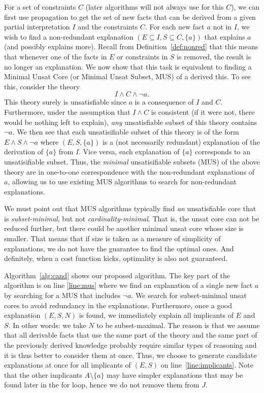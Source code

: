 For a set of constraints $C$ (later algorithms will not always use \allconstraints for this $C$), we can first use propagation to get the set of new facts that can be derived from a given partial interpretation $I$ and the constraints $C$. For each new fact $a$ not in $I$, we wish to find a non-redundant explanation $(E \subseteq I, S \subseteq C,\{a\})$ that explains $a$ (and possibly explains more). Recall from Definition~\ref{def:nonred} that this means that whenever one of the facts in $E$ or constraints in $S$ is removed, the result is no longer an explanation.
We now show that this task is equivalent to finding a Minimal Unsat Core (or Minimal Unsat Subset, MUS) of a derived this.
To see this, consider the theory
\[ I\wedge C \wedge \lnot a.\]
This theory surely is unsatisfiable since $a$ is a consequence of $I$ and $C$.
Furthermore, under the assumption that $I\wedge C$ is consistent (if it were not, there would be nothing left to explain),
\emph{any} unsatisfiable subset of this theory contains $\lnot a$.
We then see that each unsatisifiable subset of this theory is of the form $E \wedge S \wedge \lnot a$ where $(E,S,\{a\})$ is a (not necessarily redundant) explanation of the derivation of $\{a\}$ from $I$.
Vice versa, each explanation of $\{a\}$ corresponds to an unsatisifiable subset. Thus, the \emph{minimal} unsatisifiable subsets (MUS) of the above theory are in one-to-one correspondence with the non-redundant explanations of $a$, allowing us to use existing MUS algorithms to search for non-redundant explanations.

We must point out that MUS algorithms typically find \textit{an} unsatisfiable core that is \textit{subset-minimal}, but not \textit{cardinality-minimal}. That is, the unsat core can not be reduced further, but there could be another minimal unsat core whose size is smaller.
That means that if size is taken as a measure of simplicity of explanations, we do not have the guarantee to find the optimal ones. And definitely, when a cost function kicks, optimality is also not guaranteed.

Algorithm~\ref{alg:cand} shows our proposed algorithm. The key part of the algorithm is on line \ref{line:mus} where we find an explanation of a single new fact $a$ by searching for a MUS that includes $\neg a$.
We search for subset-minimal unsat cores to avoid redundancy in the explanations.
Furthermore, once a good explanation $(E,S,N)$ is found, we immediately explain all implicants of $E$ and $S$. In other words: we take $N$ to be subset-maximal.
The reason is that we assume that all derivable facts that use the same part of the theory and the same part of the previously derived knowledge probably require similar types of reasoning and it is thus better to consider them at once.
Thus, we choose to generate candidate explanations at once for all implicants of $(E, S)$ on line~\ref{line:implicants}.
Note that the other implicants $A \setminus \{a\}$ may have simpler explanations that may be found later in the for loop, hence we do not remove them from $J$.

